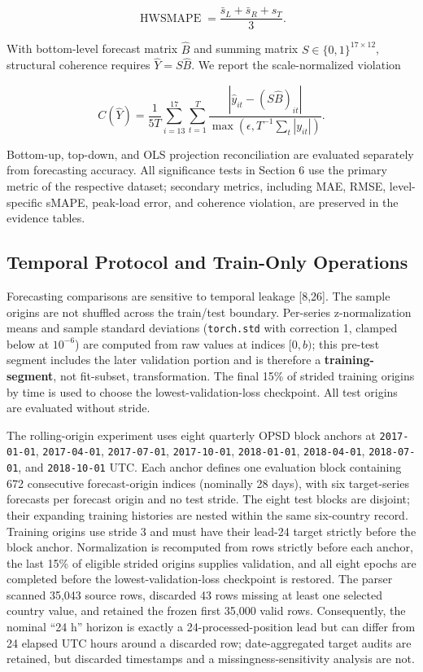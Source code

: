 \documentclass[electronics,article,submit,moreauthors]{Definitions/mdpi}
\begin{document}
\[
\operatorname{HWSMAPE}=\frac{\bar s_L+\bar s_R+s_T}{3}.
\]

With bottom-level forecast matrix \(\hat{B}\) and summing matrix \(S\in\{0,1\}^{17\times12}\), structural coherence requires \(\hat{Y}=S\hat{B}\). We report the scale-normalized violation

\[
C(\hat Y)=\frac{1}{5T}\sum_{i=13}^{17}\sum_{t=1}^{T}
\frac{|\hat y_{it}-(S\hat B)_{it}|}{\max(\epsilon,T^{-1}\sum_t|y_{it}|)}.
\]

Bottom-up, top-down, and OLS projection reconciliation are evaluated separately from forecasting accuracy. All significance tests in Section 6 use the primary metric of the respective dataset; secondary metrics, including MAE, RMSE, level-specific sMAPE, peak-load error, and coherence violation, are preserved in the evidence tables.

\subsection{Temporal Protocol and Train-Only Operations}\label{temporal-protocol-and-train-only-operations}

Forecasting comparisons are sensitive to temporal leakage {[}8,26{]}. The sample origins are not shuffled across the train/test boundary. Per-series z-normalization means and sample standard deviations (\texttt{torch.std} with correction 1, clamped below at \(10^{-6}\)) are computed from raw values at indices \([0,b)\); this pre-test segment includes the later validation portion and is therefore a \textbf{training-segment}, not fit-subset, transformation. The final 15\% of strided training origins by time is used to choose the lowest-validation-loss checkpoint. All test origins are evaluated without stride.

The rolling-origin experiment uses eight quarterly OPSD block anchors at \texttt{2017-01-01}, \texttt{2017-04-01}, \texttt{2017-07-01}, \texttt{2017-10-01}, \texttt{2018-01-01}, \texttt{2018-04-01}, \texttt{2018-07-01}, and \texttt{2018-10-01} UTC. Each anchor defines one evaluation block containing 672 consecutive forecast-origin indices (nominally 28 days), with six target-series forecasts per forecast origin and no test stride. The eight test blocks are disjoint; their expanding training histories are nested within the same six-country record. Training origins use stride 3 and must have their lead-24 target strictly before the block anchor. Normalization is recomputed from rows strictly before each anchor, the last 15\% of eligible strided origins supplies validation, and all eight epochs are completed before the lowest-validation-loss checkpoint is restored. The parser scanned 35,043 source rows, discarded 43 rows missing at least one selected country value, and retained the frozen first 35,000 valid rows. Consequently, the nominal ``24 h'' horizon is exactly a 24-processed-position lead but can differ from 24 elapsed UTC hours around a discarded row; date-aggregated target audits are retained, but discarded timestamps and a missingness-sensitivity analysis are not.
\end{document}
